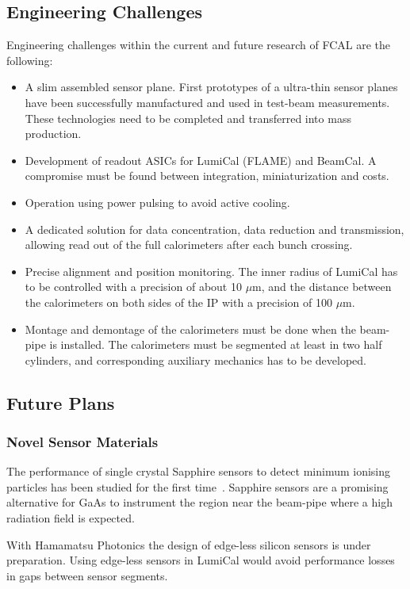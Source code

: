 \subsection{Engineering Challenges}
Engineering challenges within the current and future research of FCAL are the following:
\begin{itemize}
\item{A slim assembled sensor plane. First prototypes of a ultra-thin sensor planes have been successfully 
manufactured and used in test-beam measurements.
These technologies need to be completed and transferred into mass production. 
}
\item{Development of readout ASICs for LumiCal (FLAME) and BeamCal.
A compromise must be found between integration, miniaturization and costs}.
\item{Operation using power pulsing to avoid active cooling}.
\item{A dedicated solution for data concentration, data reduction and transmission, allowing read out of 
the full calorimeters after each bunch crossing}.
\item{Precise alignment and position monitoring. The inner radius of LumiCal has to be controlled with a precision
of about 10 {$\mu$}m, and the distance between the 
calorimeters on both sides of the IP with a precision of 100 {$\mu$}m}.
\item{Montage and demontage of the calorimeters must be done when the beam-pipe is installed. The calorimeters must be segmented at 
least in two half cylinders, and corresponding auxiliary mechanics has to be developed.}
\end{itemize}

\subsection{Future Plans}

\subsubsection{Novel Sensor Materials}

The performance of single crystal Sapphire sensors to detect minimum ionising particles has been studied for the 
first time~\cite{1748-0221-10-08-P08008}. Sapphire sensors are a promising alternative for GaAs to instrument
the region near the beam-pipe where a high radiation field is expected.

With Hamamatsu Photonics the design of 
edge-less silicon sensors is under preparation. Using edge-less sensors in LumiCal would avoid performance losses 
in gaps between sensor segments.

